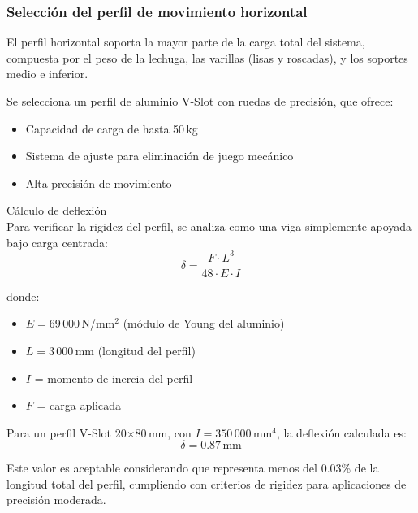 \subsubsection{Selección del perfil de movimiento horizontal}
El perfil horizontal soporta la mayor parte de la carga total del sistema, compuesta por el peso de la lechuga, las varillas (lisas y roscadas), y los soportes medio e inferior.

Se selecciona un perfil de aluminio V-Slot con ruedas de precisión, que ofrece:
\begin{itemize}[label=$\bullet$]
    \item Capacidad de carga de hasta 50\,kg
    \item Sistema de ajuste para eliminación de juego mecánico
    \item Alta precisión de movimiento
\end{itemize}

Cálculo de deflexión \\
\noindent
Para verificar la rigidez del perfil, se analiza como una viga simplemente apoyada bajo carga centrada:
\begin{equation}
\delta = \frac{F \cdot L^3}{48 \cdot E \cdot I}
\label{eq:deflexion_perfil}
\end{equation}

donde:
\begin{itemize}[label=$\bullet$]
    \item $E = 69\,000$\,N/mm$^2$ (módulo de Young del aluminio)
    \item $L = 3\,000$\,mm (longitud del perfil)
    \item $I$ = momento de inercia del perfil
    \item $F$ = carga aplicada
\end{itemize}

Para un perfil V-Slot 20$\times$80\,mm, con $I = 350\,000$\,mm$^4$, la deflexión calculada es:
\[\delta = 0.87\,\text{mm}\]

Este valor es aceptable considerando que representa menos del 0.03\% de la longitud total del perfil, cumpliendo con criterios de rigidez para aplicaciones de precisión moderada.

